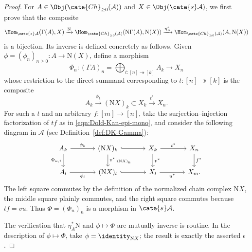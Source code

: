 \begin{proof}
	For $A\in\Obj(\cate{Ch}_{\geq0}(\mathcal{A}))$ and
	$X\in\Obj(\cate{s}\mathcal{A})$, we first prove that the composite
	\[ \Hom_{\cate{s}\mathcal{A}}(\Gamma(A), X) \xrightarrow{\mathrm{N}} \Hom_{\cate{Ch}_{\geq 0}(\mathcal{A})}(\mathrm{N}\Gamma(A), \mathrm{N}(X)) \xrightarrow{\eta_A^*} \Hom_{\cate{Ch}_{\geq 0}(\mathcal{A})}(A, \mathrm{N}(X)) \]
	is a bijection. Its inverse is defined concretely as follows. Given
	$\phi=(\phi_n)_{n\geq0}:A\to\mathrm{N}(X)$, define a morphism
	\[ \Phi_n: (\Gamma A)_n = \bigoplus_{t: [n] \twoheadrightarrow [k]} A_k \to X_n \]
	whose restriction to the direct summand corresponding to
	$t:[n]\twoheadrightarrow[k]$ is the composite
	\[ A_k \xrightarrow{\phi_k} (\mathrm{N}X)_k \subset X_k \xrightarrow{t^*} X_n. \]
	For such a $t$ and an arbitrary $f:[m]\to[n]$, take the
	surjection--injection factorization of $tf$ as in
	\eqref{eqn:Dold-Kan-epi-mono}, and consider the following diagram in
	$\mathcal{A}$ (see Definition~\ref{def:DK-Gamma}):
	\[\begin{tikzcd}[column sep=large]
		A_k \arrow[r, "\phi_k"] \arrow[d, "{\Phi_{u, t}}"'] & (\mathrm{N}X)_k \arrow[hookrightarrow, r] \arrow[d, "{v^*|_{(\mathrm{N}X)_k}}"] & X_k \arrow[r, "{t^*}"] \arrow[d, "{v^*}"] & X_n \arrow[d, "{f^*}"] \\
		A_l \arrow[r, "\phi_l"'] & (\mathrm{N}X)_l \arrow[hookrightarrow, r] & X_l \arrow[r, "{u^*}"'] & X_m.
	\end{tikzcd}\]
	The left square commutes by the definition of the normalized chain complex
	$\mathrm{N}X$, the middle square plainly commutes, and the right square
	commutes because $tf=vu$. Thus $\Phi=(\Phi_n)_n$ is a morphism in
	$\cate{s}\mathcal{A}$.

	The verification that $\eta_A^*\mathrm{N}$ and $\phi\mapsto\Phi$ are
	mutually inverse is routine. In the description of $\phi\mapsto\Phi$,
	take $\phi=\identity_{\mathrm{N}X}$; the result is exactly the asserted
	$\epsilon$.
\end{proof}

